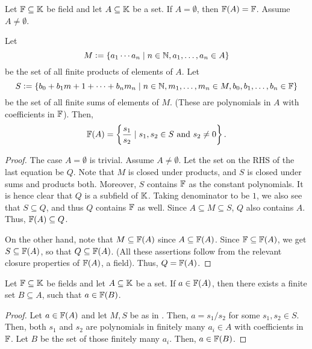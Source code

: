 \begin{prop} \label{prop:field-generation-construction}
    Let $\mathbb{F} \subseteq \mathbb{K}$ be field and let $A \subseteq \mathbb{K}$ be a set. If $A = \emptyset$, then $\mathbb{F}(A) = \mathbb{F}$. Assume $A \neq \emptyset$.
    
    Let 
    \[
        M \vcentcolon= \left\{ a_1\cdots a_n \mid n \in \mathbb{N}, a_1, \ldots, a_n \in A \right\}
    \]
    be the set of all finite products of elements of $A$. Let
    \[
        S \vcentcolon= \left\{ b_0 + b_1m+1 + \cdots + b_nm_n \mid n \in \mathbb{N}, m_1, \ldots, m_n \in M, b_0,b_1,\ldots, b_n \in \mathbb{F} \right\}
    \]
    be the set of all finite sums of elements of $M$. (These are polynomials in $A$ with coefficients in $\mathbb{F}$). Then, 
    \[
        \mathbb{F}(A) = \left\{ \frac{s_1}{s_2} \mid s_1,s_2 \in S \text{ and } s_2 \neq 0 \right\}.
    \]
\end{prop}
\begin{proof}
    The case $A = \emptyset$ is trivial. Assume $A \neq \emptyset$. Let the set on the RHS of the last equation be $Q$. Note that $M$ is closed under products, and $S$ is closed under sums and products both. Moreover, $S$ contains $\mathbb{F}$ as the constant polynomials. It is hence clear that $Q$ is a subfield of $\mathbb{K}$. Taking denominator to be $1$, we also see that $S \subseteq Q$, and thus $Q$ contains $\mathbb{F}$ as well. Since $A \subseteq M \subseteq S$, $Q$ also contains $A$. Thus, $\mathbb{F}(A) \subseteq Q$.
    
    On the other hand, note that $M \subseteq \mathbb{F}(A)$ since $A \subseteq \mathbb{F}(A)$. Since $\mathbb{F} \subseteq \mathbb{F}(A)$, we get $S \subseteq \mathbb{F}(A)$, so that $Q \subseteq \mathbb{F}(A)$. (All these assertions follow from the relevant closure properties of $\mathbb{F}(A)$, a field). Thus, $Q = \mathbb{F}(A)$.
\end{proof}

\begin{cor} \label{cor:exists-a-finite-set-with-a-in-F(B)}
    Let $\mathbb{F} \subseteq \mathbb{K}$ be fields and let $A \subseteq \mathbb{K}$ be a set. If $a \in \mathbb{F}(A)$, then there exists a finite set $B \subseteq A$, such that $a \in \mathbb{F}(B)$.
\end{cor}
\begin{proof}
    Let $a \in \mathbb{F}(A)$ and let $M,S$ be as in . Then, $a = s_1/s_2$ for some $s_1, s_2 \in S$. Then, both $s_1$ and $s_2$ are polynomials in finitely many $a_i \in A$ with coefficients in $\mathbb{F}$. Let $B$ be the set of those finitely many $a_i$. Then, $a \in \mathbb{F}(B)$.
\end{proof}

